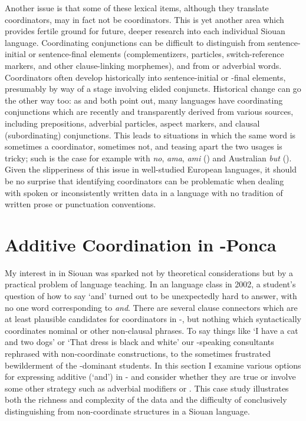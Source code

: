 \documentclass[output=paper]{LSP/langsci}
\begin{document}
Another issue is that some of these lexical items, although they translate  coordinators, may in fact not be coordinators. This is yet another area which provides fertile ground for future, deeper research into each individual Siouan language. Coordinating conjunctions can be difficult to distinguish from sentence-initial or sentence-final elements (complementizers,  particles, switch-reference markers, and other clause-linking morphemes), and from  or adverbial words. Coordinators often develop historically into sentence-initial or -final elements, presumably by way of a stage involving elided conjuncts. Historical change can go the other way too: as \citet{Mithun1988} and \citet{Stassen2000} both point out, many languages have coordinating conjunctions which are recently and transparently derived from various sources, including  prepositions, adverbial particles, aspect markers, and clausal (subordinating) conjunctions. This leads to situations in which the same word is sometimes a coordinator, sometimes not, and teasing apart the two usages is tricky; such is the case for example with  \textit{no}, \textit{ama}, \textit{ami} (\citealt{Fielder2008}) and Australian  \textit{but} (\citealt{MulderThompson2008}). Given the slipperiness of this issue in well-studied European languages, it should be no surprise that identifying coordinators can be problematic when dealing with spoken or inconsistently written data in a language with no tradition of written prose or punctuation conventions.

\section{Additive Coordination in -Ponca}\label{sec:rudin:3}

My interest in  in Siouan was sparked not by theoretical considerations but by a practical problem of language teaching. In an  language class in 2002, a student's question of how to say `and' turned out to be unexpectedly hard to answer, with no one word corresponding to  \textit{and}. There are several clause connectors which are at least plausible candidates for coordinators in -, but nothing which syntactically coordinates nominal or other non-clausal phrases. To say things like `I have a cat and two dogs' or `That dress is black and white' our -speaking consultants rephrased with non-coordinate constructions, to the sometimes frustrated bewilderment of the -dominant students.  In this section I examine various options for expressing additive  (`and') in - and consider whether they are true  or involve some other strategy such as adverbial modifiers or . This case study illustrates both the richness and complexity of the data and the difficulty of conclusively distinguishing  from non-coordinate structures in a Siouan language.
\end{document}
